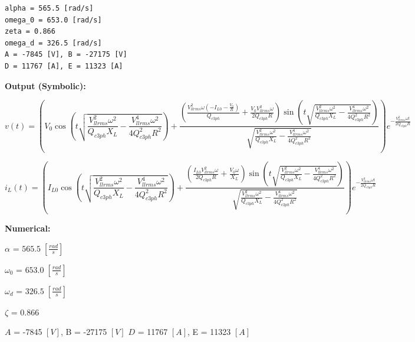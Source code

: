 \begin{verbatim}
alpha = 565.5 [rad/s]
omega_0 = 653.0 [rad/s]
zeta = 0.866
omega_d = 326.5 [rad/s]
A = -7845 [V], B = -27175 [V]
D = 11767 [A], E = 11323 [A]
\end{verbatim}

\textbf{Output (Symbolic):}

\begin{equation}
v\left(t \right) = \left(V_{0} \cos\left(t \sqrt{\frac{V_{llrms}^{2} \omega^{2}}{Q_{c3ph} X_{L}} - \frac{V_{llrms}^{4} \omega^{2}}{4 Q_{c3ph}^{2} R^{2}}}\right) + \frac{\left(\frac{V_{llrms}^{2} \omega \left(- I_{L0} - \frac{V_{0}}{R}\right)}{Q_{c3ph}} + \frac{V_{0} V_{llrms}^{2} \omega}{2 Q_{c3ph} R}\right) \sin\left(t \sqrt{\frac{V_{llrms}^{2} \omega^{2}}{Q_{c3ph} X_{L}} - \frac{V_{llrms}^{4} \omega^{2}}{4 Q_{c3ph}^{2} R^{2}}}\right)}{\sqrt{\frac{V_{llrms}^{2} \omega^{2}}{Q_{c3ph} X_{L}} - \frac{V_{llrms}^{4} \omega^{2}}{4 Q_{c3ph}^{2} R^{2}}}}\right) e^{- \frac{V_{llrms}^{2} \omega t}{2 Q_{c3ph} R}}
\end{equation}

\begin{equation}
i_{L}\left(t \right) = \left(I_{L0} \cos\left(t \sqrt{\frac{V_{llrms}^{2} \omega^{2}}{Q_{c3ph} X_{L}} - \frac{V_{llrms}^{4} \omega^{2}}{4 Q_{c3ph}^{2} R^{2}}}\right) + \frac{\left(\frac{I_{L0} V_{llrms}^{2} \omega}{2 Q_{c3ph} R} + \frac{V_{0} \omega}{X_{L}}\right) \sin\left(t \sqrt{\frac{V_{llrms}^{2} \omega^{2}}{Q_{c3ph} X_{L}} - \frac{V_{llrms}^{4} \omega^{2}}{4 Q_{c3ph}^{2} R^{2}}}\right)}{\sqrt{\frac{V_{llrms}^{2} \omega^{2}}{Q_{c3ph} X_{L}} - \frac{V_{llrms}^{4} \omega^{2}}{4 Q_{c3ph}^{2} R^{2}}}}\right) e^{- \frac{V_{llrms}^{2} \omega t}{2 Q_{c3ph} R}}
\end{equation}

\textbf{Numerical:} \newline

$\alpha$ = $565.5\;\left[\frac{rad}{s}\right]$ \newline

$\omega_0$ = $653.0\;\left[\frac{rad}{s}\right]$ \newline

$\omega_d$ = $326.5\;\left[\frac{rad}{s}\right]$ \newline

$\zeta$ = 0.866

$A$ = -7845 $\left[V\right]$, B = -27175 $\left[V\right]$\newline
$D$ = 11767 $\left[A\right]$, E = 11323 $\left[A\right]$

